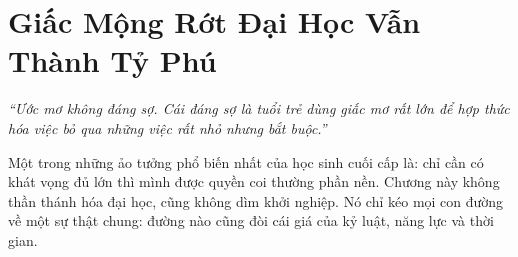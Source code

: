 \chapter{Giấc Mộng Rớt Đại Học Vẫn Thành Tỷ Phú}

\begin{center}
	\textit{\color{bookprimary}``Ước mơ không đáng sợ. Cái đáng sợ là tuổi trẻ dùng giấc mơ rất lớn để hợp thức hóa việc bỏ qua những việc rất nhỏ nhưng bắt buộc.''}
\end{center}

\ngancach

\begin{tcolorbox}[
	colback=bookprimary!6,
	colframe=bookprimary!35,
	arc=5pt,
	title={\bfseries Trục Suy Nghĩ},
	fonttitle=\bfseries\color{bookprimary}
]
Một trong những ảo tưởng phổ biến nhất của học sinh cuối cấp là: chỉ cần có khát vọng đủ lớn thì mình được quyền coi thường phần nền. Chương này không thần thánh hóa đại học, cũng không dìm khởi nghiệp. Nó chỉ kéo mọi con đường về một sự thật chung: đường nào cũng đòi cái giá của kỷ luật, năng lực và thời gian.
\end{tcolorbox}

